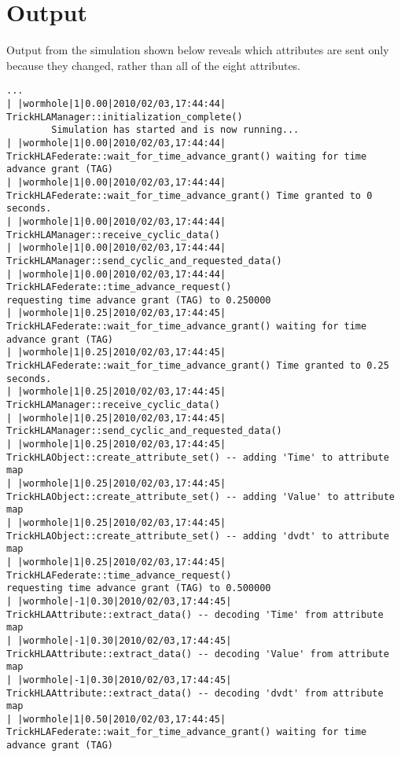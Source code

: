\section{Output}

Output from the simulation shown below reveals which attributes are sent only
because they changed, rather than all of the eight attributes.

\begin{lstlisting}[numbers=none,caption={output showing conditionally sent cyclic data}]
    ...
| |wormhole|1|0.00|2010/02/03,17:44:44| TrickHLAManager::initialization_complete()
        Simulation has started and is now running...
| |wormhole|1|0.00|2010/02/03,17:44:44| TrickHLAFederate::wait_for_time_advance_grant() waiting for time advance grant (TAG)
| |wormhole|1|0.00|2010/02/03,17:44:44| TrickHLAFederate::wait_for_time_advance_grant() Time granted to 0 seconds.
| |wormhole|1|0.00|2010/02/03,17:44:44| TrickHLAManager::receive_cyclic_data()
| |wormhole|1|0.00|2010/02/03,17:44:44| TrickHLAManager::send_cyclic_and_requested_data()
| |wormhole|1|0.00|2010/02/03,17:44:44| TrickHLAFederate::time_advance_request()   
requesting time advance grant (TAG) to 0.250000
| |wormhole|1|0.25|2010/02/03,17:44:45| TrickHLAFederate::wait_for_time_advance_grant() waiting for time advance grant (TAG)
| |wormhole|1|0.25|2010/02/03,17:44:45| TrickHLAFederate::wait_for_time_advance_grant() Time granted to 0.25 seconds.
| |wormhole|1|0.25|2010/02/03,17:44:45| TrickHLAManager::receive_cyclic_data()
| |wormhole|1|0.25|2010/02/03,17:44:45| TrickHLAManager::send_cyclic_and_requested_data()
| |wormhole|1|0.25|2010/02/03,17:44:45| TrickHLAObject::create_attribute_set() -- adding 'Time' to attribute map
| |wormhole|1|0.25|2010/02/03,17:44:45| TrickHLAObject::create_attribute_set() -- adding 'Value' to attribute map
| |wormhole|1|0.25|2010/02/03,17:44:45| TrickHLAObject::create_attribute_set() -- adding 'dvdt' to attribute map
| |wormhole|1|0.25|2010/02/03,17:44:45| TrickHLAFederate::time_advance_request()   
requesting time advance grant (TAG) to 0.500000
| |wormhole|-1|0.30|2010/02/03,17:44:45| TrickHLAAttribute::extract_data() -- decoding 'Time' from attribute map
| |wormhole|-1|0.30|2010/02/03,17:44:45| TrickHLAAttribute::extract_data() -- decoding 'Value' from attribute map
| |wormhole|-1|0.30|2010/02/03,17:44:45| TrickHLAAttribute::extract_data() -- decoding 'dvdt' from attribute map
| |wormhole|1|0.50|2010/02/03,17:44:45| TrickHLAFederate::wait_for_time_advance_grant() waiting for time advance grant (TAG)

\end{lstlisting}
